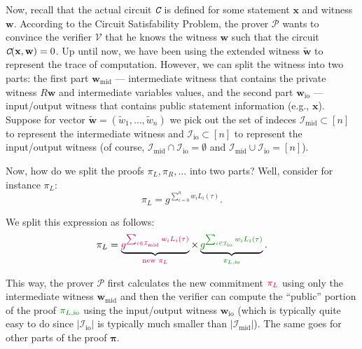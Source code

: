 \documentclass[../lecture-notes.tex]{subfiles}
\begin{document}
Now, recall that the actual circuit $\textit{\texttt{C}}$ is defined for some statement $\mathbf{x}$ and witness $\mathbf{w}$. According to the Circuit Satisfability Problem, 
the prover $\mathcal{P}$ wants to convince the verifier $\mathcal{V}$ that he knows the witness $\mathbf{w}$ 
such that the circuit $\textit{\texttt{C}}(\mathbf{x}, \mathbf{w}) = 0$. Up until now, we have been using 
the extended witness $\widetilde{\mathbf{w}}$ to represent the trace of computation. 
However, we can split the witness into two parts: the first part $\mathbf{w}_{\text{mid}}$ --- intermediate witness 
that contains the private witness $R\mathbf{w}$ and intermediate variables values, and 
the second part $\mathbf{w}_{\text{io}}$ --- input/output witness that contains public 
statement information (e.g., $\mathbf{x}$). Suppose for vector $\widetilde{\mathbf{w}} = (\widetilde{w}_1,\dots,\widetilde{w}_n)$ 
we pick out the set of indeces $\mathcal{I}_{\text{mid}} \subset [n]$ to represent the intermediate witness 
and $\mathcal{I}_{\text{io}} \subset [n]$ to represent the input/output witness 
(of course, $\mathcal{I}_{\text{mid}} \cap \mathcal{I}_{\text{io}} = \emptyset$ 
and $\mathcal{I}_{\text{mid}} \cup \mathcal{I}_{\text{io}} = [n]$).

Now, how do we split the proofs $\pi_L,\pi_R,\dots$ into two parts? Well, consider for instance $\pi_L$:
\begin{equation*}
    \pi_L = g^{\sum_{i=0}^n w_iL_i(\tau)}.
\end{equation*}

We split this expression as follows:
\begin{equation*}
    \pi_L = \underbrace{\textcolor{purple}{g^{\sum_{i \in \mathcal{I}_{\text{mid}}} w_iL_i(\tau)}}}_{\textcolor{purple}{\text{new $\pi_L$}}} 
    \times 
    \underbrace{\textcolor{green!50!black}{g^{\sum_{i \in \mathcal{I}_{\text{io}}} w_iL_i(\tau)}}}_{\textcolor{green!50!black}{\pi_{L,\text{io}}}}.
\end{equation*}

This way, the prover $\mathcal{P}$ first calculates the new commitment $\textcolor{purple}{\pi_L}$ using 
only the intermediate witness $\mathbf{w}_{\text{mid}}$ and then 
the verifier can compute the ``public'' portion of the proof $\textcolor{green!50!black}{\pi_{L,\text{io}}}$ 
using the input/output witness $\mathbf{w}_{\text{io}}$ 
(which is typically quite easy to do since $|\mathcal{I}_{\text{io}}|$ is typically much smaller than 
$|\mathcal{I}_{\text{mid}}|$). The same goes for other parts of the proof $\boldsymbol{\pi}$.
\end{document}
